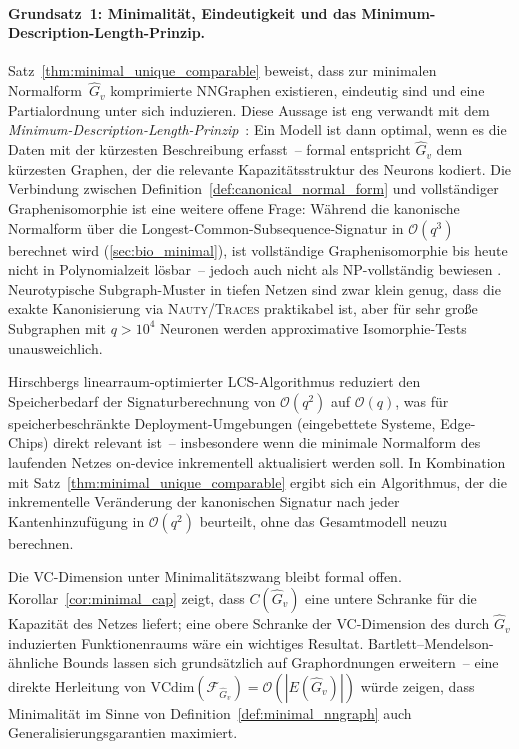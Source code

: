 \documentclass[12pt, a4paper, openany]{report}
\newcommand{\calF}{\mathcal{F}}
\begin{document}
\paragraph{Grundsatz~1: Minimalität, Eindeutigkeit und das Minimum-Description-Length-Prinzip.}
Satz~\ref{thm:minimal_unique_comparable} beweist, dass zur minimalen
Normal\-form~$\hat{G}_v$ komprimierte NNGraphen existieren, eindeutig sind
und eine Partialordnung unter sich induzieren.  Diese Aussage ist eng
verwandt mit dem
\emph{Minimum-Description-Length-Prinzip}~\cite{rissanen78}: Ein Modell ist
dann optimal, wenn es die Daten mit der kürzesten Beschreibung erfasst~--
formal entspricht $\hat{G}_v$ dem kürzesten Graphen, der die relevante
Kapazitäts\-struktur des Neurons kodiert.  Die Verbindung zwischen
Definition~\ref{def:canonical_normal_form} und vollständiger
Graphenisomorphie ist eine weitere offene Frage: Während die kanonische
Normalform über die Longest-Common-Subsequence-Signatur in $\mathcal{O}(q^3)$
berechnet wird (\cref{sec:bio_minimal}), ist vollständige Graphenisomorphie
bis heute nicht in Polynomialzeit lösbar~-- jedoch auch nicht als NP-vollständig
bewiesen \cite{mckay14}.  Neurotypische Subgraph-Muster in tiefen Netzen sind
zwar klein genug, dass die exakte Kanonisierung via \textsc{Nauty}/\textsc{Traces}
\cite{mckay14} praktikabel ist, aber für sehr große Subgraphen mit
$q > 10^4$ Neuronen werden approximative Isomorphie-Tests unausweichlich.

Hirschbergs linearraum-optimierter LCS-Algorithmus \cite{hirschberg75}
reduziert den Speicherbedarf der Signaturberechnung von $\mathcal{O}(q^2)$
auf $\mathcal{O}(q)$, was für speicherbeschränkte Deployment-Umgebungen
(eingebettete Systeme, Edge-Chips) direkt relevant ist~-- insbesondere wenn
die minimale Normalform des laufenden Netzes on-device inkrementell aktualisiert
werden soll.  In Kombination mit Satz~\ref{thm:minimal_unique_comparable}
ergibt sich ein Algorithmus, der die inkrementelle Veränderung der
kanonischen Signatur nach jeder Kanten\-hin\-zu\-fü\-gung in
$\mathcal{O}(q^2)$ beurteilt, ohne das Gesamtmodell neuzu berechnen.

Die VC-Dimension unter Minimalitätszwang bleibt formal offen.
Korollar~\ref{cor:minimal_cap} zeigt, dass $C(\hat{G}_v)$ eine untere
Schranke für die Kapazität des Netzes liefert; eine obere Schranke der
VC-Dimension des durch $\hat{G}_v$ induzierten Funktionenraums wäre ein
wichtiges Resultat.  Bartlett–Mendelson-ähnliche Bounds \cite{bartlett_mendelson02}
lassen sich grundsätzlich auf Graphordnungen erweitern~-- eine direkte
Herleitung von $\text{VCdim}(\calF_{\hat{G}_v}) = \mathcal{O}(|E(\hat{G}_v)|)$
würde zeigen, dass Minimalität im Sinne von Definition~\ref{def:minimal_nngraph}
auch Generalisierungsgarantien maximiert.
\end{document}
